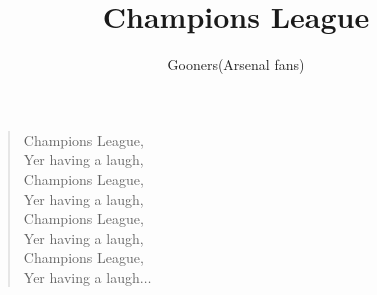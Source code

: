 \documentclass[a4paper,12pt]{article}
\title{Champions League}
\author{Gooners(Arsenal fans)}
\date{}
\begin{document}
	
	\maketitle
	
	\begin{verse}
		
		Champions League, \\
		Yer having a laugh, \\
		Champions League, \\
		Yer having a laugh, \\
		Champions League, \\
		Yer having a laugh, \\
		Champions League, \\
		Yer having a laugh$\ldots$
		
	\end{verse}
	
\end{document}
